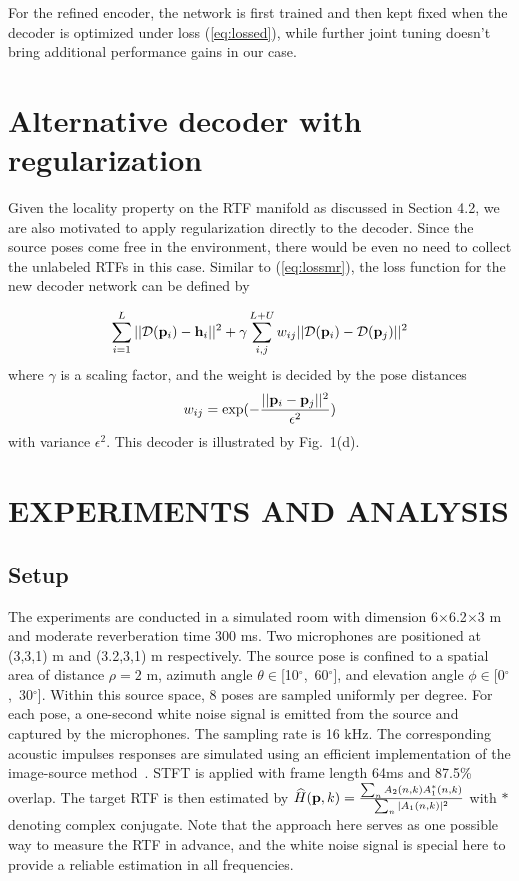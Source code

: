 \documentclass{article}
\begin{document}
For the refined encoder, the network is first trained and then kept fixed when the decoder is optimized under loss (\ref{eq:lossed}), while further joint tuning doesn't bring additional performance gains in our case.


\section{Alternative decoder with regularization}


Given the locality property on the RTF manifold as discussed in Section 4.2, we are also motivated to apply regularization directly to the decoder. Since the source poses come free in the environment, there would be even no need to collect the unlabeled RTFs in this case. Similar to (\ref{eq:lossmr}), the loss function for the new decoder network can be defined by

\begin{equation}\label{eq:lossdr}
\sum_{i=1}^{L}||\mathcal{D}({\bf p}_i)-{\bf h}_i||^2 + \gamma \sum_{i,j}^{L+U}w_{ij}||\mathcal{D}({\bf p}_i)-\mathcal{D}({\bf p}_j)||^2
\end{equation}
where $\gamma$ is a scaling factor, and the weight is decided by the pose distances
\begin{equation}\label{eq:wij2}
  w_{ij} = \exp(-\frac{||{\bf p}_i-{\bf p}_j||^2}{\epsilon^2})
\end{equation}
with variance $\epsilon^2$. This decoder is illustrated by Fig.~1(d).


\section{EXPERIMENTS AND ANALYSIS}

\subsection{Setup}


The experiments are conducted in a simulated room with dimension 6$\times$6.2$\times$3 m and moderate reverberation time 300 ms. Two microphones are positioned at (3,3,1) m and (3.2,3,1) m respectively. The source pose is confined to a spatial area of distance $\rho=2$ m, azimuth angle $\theta \in$[10$^{\circ}$,~60$^{\circ}$], and elevation angle $\phi \in$[0$^{\circ}$,~30$^{\circ}$]. Within this source space, 8 poses are sampled uniformly per degree. For each pose, a one-second white noise signal is emitted from the source and captured by the microphones. The sampling rate is 16 kHz. The corresponding acoustic impulses responses are simulated using an efficient implementation of the image-source method~\cite{rirge}. STFT is applied with frame length 64ms and 87.5\% overlap. The target RTF is then estimated by $\widehat{H}({\bf p}, k)=\frac{\sum_n A_2(n, k)A_1^*(n, k)}{\sum_n |A_1(n, k)|^2}$ with $*$ denoting complex conjugate. Note that the approach here serves as one possible way to measure the RTF in advance, and the white noise signal is special here to provide a reliable estimation in all frequencies.
\end{document}
